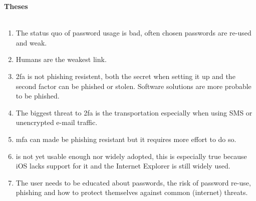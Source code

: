 \thispagestyle{noheader}

\begin{large}
	\textbf{Theses} \\ \\
\end{large}


\begin{enumerate}
	\setlength{\itemsep}{1cm}
	\item The status quo of password usage is bad, often chosen passwords are re-used and weak.
	\item Humans are the weakest link.
	\item \gls{2fa} is not phishing resistent, both the secret when setting it up and the second factor can be phished or stolen. Software solutions are more probable to be phished.
	\item The biggest threat to \gls{2fa} is the transportation especially when using SMS or unencrypted e-mail traffic.
	\item \gls{mfa} can made be phishing resistant but it requires more effort to do so.	
	\item \wa{} is not yet usable enough nor widely adopted, this is especially true because iOS lacks support for it and the Internet Explorer is still widely used.
	\item The user needs to be educated about passwords, the risk of password re-use, phishing and how to protect themselves against common (internet) threats.
\end{enumerate}
